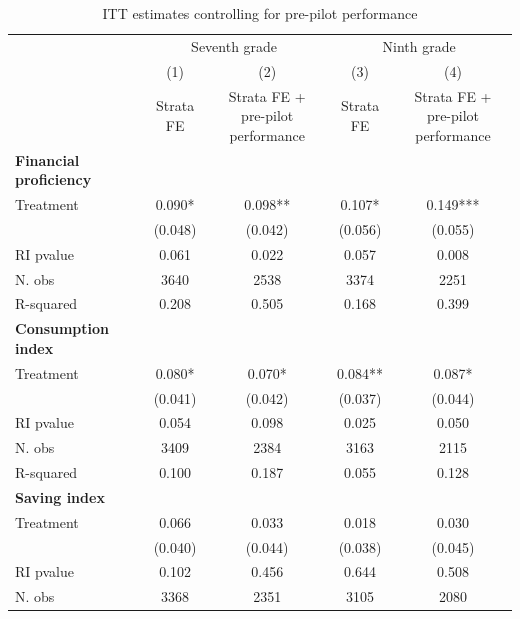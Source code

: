 \documentclass[
	article,			%
	12pt,				%
	oneside,			%
	a4paper,			%
	]{article}
\begin{document}
\begin{table}[ht]
\centering
\begin{threeparttable}
\fontsize{9}{10}\selectfont
\caption{ITT estimates controlling for pre-pilot performance}\label{tab:add_5prof_control}
\begin{tabular*}{\textwidth}{@{\extracolsep{\fill}}lcccc@{}}
\toprule
 & \multicolumn{2}{c}{Seventh grade} & \multicolumn{2}{c}{Ninth grade} \\
\cmidrule(lr){2-3}\cmidrule(lr){4-5}
 & (1) & (2) & (3) & (4) \\
 & Strata FE & \shortstack{Strata FE +\\ pre-pilot performance} & Strata FE & \shortstack{Strata FE +\\ pre-pilot performance} \\
\midrule
\textbf{Financial proficiency} &  &  &  &  \\
Treatment   &     0.090* &    0.098** &     0.107* &   0.149*** \\
            &    (0.048) &    (0.042) &    (0.056) &    (0.055) \\
RI pvalue   &      0.061 &      0.022 &      0.057 &      0.008 \\
N. obs      &       3640 &       2538 &       3374 &       2251 \\
R-squared   &      0.208 &      0.505 &      0.168 &      0.399 \\
\midrule
\textbf{Consumption index} &  &  &  &  \\
Treatment   &     0.080* &     0.070* &    0.084** &     0.087* \\
            &    (0.041) &    (0.042) &    (0.037) &    (0.044) \\
RI pvalue   &      0.054 &      0.098 &      0.025 &      0.050 \\
N. obs      &       3409 &       2384 &       3163 &       2115 \\
R-squared   &      0.100 &      0.187 &      0.055 &      0.128 \\
\midrule
\textbf{Saving index} &  &  &  &  \\
Treatment   &      0.066 &      0.033 &      0.018 &      0.030 \\
            &    (0.040) &    (0.044) &    (0.038) &    (0.045) \\
RI pvalue   &      0.102 &      0.456 &      0.644 &      0.508 \\
N. obs      &       3368 &       2351 &       3105 &       2080 \\

\end{tabular*}
\end{threeparttable}
\end{table}
\end{document}
